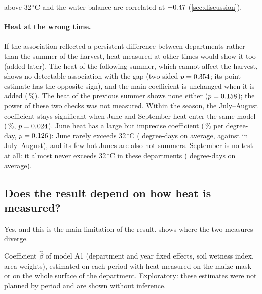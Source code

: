 above 32\,$^{\circ}$C and the water balance are correlated at $-0.47$ (\cref{sec:discussion}).

\paragraph{Heat at the wrong time.} If the association reflected a persistent difference between departments rather than the summer of the harvest, heat measured at other times would show it too (added later). The heat of the following summer, which cannot affect the harvest, shows no detectable association with the gap (two-sided $p = 0.354$; its point estimate has the opposite sign), and the main coefficient is unchanged when it is added (\LeadMainPct\,\%). The heat of the previous summer shows none either ($p = 0.158$); the power of these two checks was not measured. Within the season, the July--August coefficient stays significant when June and September heat enter the same model (\JaCalPct\,\%, $p = 0.024$). June heat has a large but imprecise coefficient (\JunePct\,\% per degree-day, $p = 0.126$): June rarely exceeds 32\,$^{\circ}$C (\JuneMean{} degree-days on average, against \JaMean{} in July--August), and its few hot Junes are also hot summers. September is no test at all: it almost never exceeds 32\,$^{\circ}$C in these departments (\SeptMean{} degree-days on average).

\subsection{Does the result depend on how heat is measured?}
\label{subsec:maize-measure}

Yes, and this is the main limitation of the result.  shows where the two measures diverge.

\begin{table}[H]
\centering
\small
\caption{Maize: coefficient by heat measure and period (point estimates, exploratory, no inference)}
\label{tab:maize-measure}
\begin{threeparttable}

\begin{tablenotes}\footnotesize
\item Coefficient $\hat\beta$ of model A1 (department and year fixed effects, soil wetness index, area weights), estimated on each period with heat measured on the maize mask or on the whole surface of the department. Exploratory: these estimates were not planned by period and are shown without inference.
\end{tablenotes}
\end{threeparttable}
\end{table}

